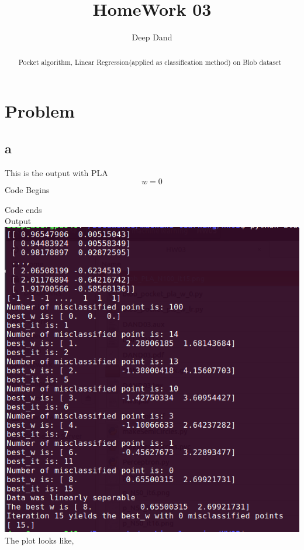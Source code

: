 \documentclass[10pt]{article}         %
\title{HomeWork 03}
\author{Deep Dand}
\begin{document}
\maketitle

\begin{abstract}
Pocket algorithm, Linear Regression(applied as classification method) on Blob dataset
\end{abstract}

\section{Problem}
\subsection{a}
This is the output with PLA $$w=0$$
Code Begins

Code ends
\\Output\\
\includegraphics[scale=0.45]{Blob_PLA1}
\\The plot looks like, 
\\
\end{document}
